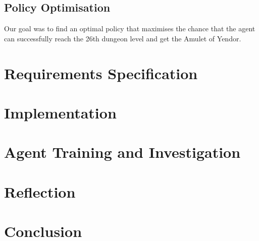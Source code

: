 \documentclass[11pt,a4paper]{article}
\begin{document}
\subsection{Policy Optimisation}
Our goal was to find an optimal policy that maximises the chance that the agent can successfully reach the 26th dungeon level and get the Amulet of Yendor.

\section{Requirements Specification}

\section{Implementation}

\section{Agent Training and Investigation}

\section{Reflection}

\section{Conclusion}

\medskip



\end{document}
